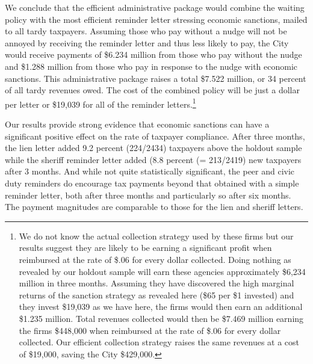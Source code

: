 \documentclass[12pt]{article}
\begin{document}
We conclude that the efficient administrative package would combine
the waiting policy with the most efficient reminder letter stressing
economic sanctions, mailed to all tardy taxpayers.  Assuming those who
pay without a nudge will not be annoyed by receiving the reminder
letter and thus less likely to pay, the City would receive payments of
\$6.234 million from those who pay without the nudge and \$1.288
million from those who pay in response to the nudge with economic
sanctions.  This administrative package raises a total \$7.522
million, or 34 percent of all tardy revenues owed.  The cost of the
combined policy will be just a dollar per letter or \$19,039 for all
of the reminder letters.\footnote{We do not know the actual collection
  strategy used by these firms but our results suggest they are likely
  to be earning a significant profit when reimbursed at the rate of
  \$.06 for every dollar collected.  Doing nothing as revealed by our
  holdout sample will earn these agencies approximately \$6,234
  million in three months.  Assuming they have discovered the high
  marginal returns of the sanction strategy as revealed here (\$65 per
  \$1 invested) and they invest \$19,039 as we have here, the firms
  would then earn an additional \$1.235 million.  Total revenues
  collected would then be \$7.469 million earning the firms \$448,000
  when reimbursed at the rate of \$.06 for every dollar collected.
  Our efficient collection strategy raises the same revenues at a cost
  of \$19,000, saving the City \$429,000.}

Our results provide strong evidence that economic sanctions can have a
significant positive effect on the rate of taxpayer compliance.  After
three months, the lien letter added 9.2 percent (224/2434) taxpayers
above the holdout sample while the sheriff reminder letter added (8.8
percent (= 213/2419) new taxpayers after 3 months.  And while not
quite statistically significant, the peer and civic duty reminders do
encourage tax payments beyond that obtained with a simple reminder
letter, both after three months and particularly so after six
months. The payment magnitudes are comparable to those for the lien
and sheriff letters.
\end{document}
